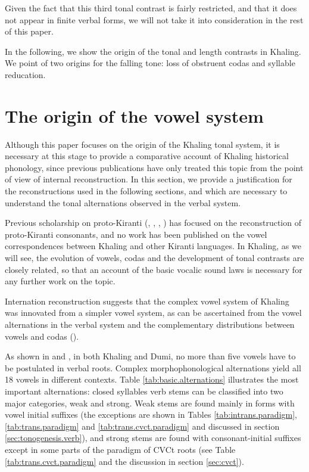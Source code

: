 \documentclass[oldfontcommands,oneside,a4paper,11pt]{article}
\begin{document}
Given the fact that this third tonal contrast is fairly restricted, and that it does not appear in finite verbal forms, we will not take it into consideration in the rest of this paper.


In the following, we show the origin of the tonal and length contrasts in Khaling. We point of two origins for the falling tone: loss of obstruent codas and syllable reducation.

\section{The origin of the vowel system}
Although this paper focuses on the origin of the Khaling tonal system, it is necessary at this stage to provide a comparative account of Khaling historical phonology, since previous publications have only treated this topic from the point of view of internal reconstruction. In this section, we provide a justification for the reconstructions used in the following sections, and which are necessary to understand the tonal alternations observed in the verbal system.

Previous scholarship on proto-Kiranti (\citealt{driem90r}, \citealt{michailovsky94stops}, \citealt{starostin94kiranti}, \citealt{opgenort05jero}) has focused on the reconstruction of proto-Kiranti consonants, and no work has been published on the vowel correspondences between Khaling and other Kiranti languages. In Khaling, as we will see, the evolution of vowels, codas and the development of tonal contrasts are closely related, so that an account of the basic vocalic sound laws is necessary for any further work on the topic.

Internation reconstruction suggests that the complex vowel system of Khaling was innovated from a simpler   vowel system, as can be ascertained from the vowel alternations in the verbal system and the complementary distributions between vowels and codas (\citealt{jacques12khaling}). 

As shown in \citet{jacques12khaling} and \citet{michailovsky12dumi}, in both Khaling and Dumi, no more than five vowels have to be postulated in verbal roots. Complex morphophonological alternations yield all 18 vowels in different contexts. Table \ref{tab:basic.alternations} illustrates  the most important alternations: closed syllables verb stems can be classified into two major categories, weak and strong. Weak stems are found mainly in forms with vowel initial suffixes (the exceptions are shown in Tables \ref{tab:intrans.paradigm}, \ref{tab:trans.paradigm} and \ref{tab:trans.cvct.paradigm} and discussed in section \ref{sec:tonogenesis.verb}), and strong stems are   found with consonant-initial suffixes except in some parts of the paradigm of CVCt roots (see Table \ref{tab:trans.cvct.paradigm} and the discussion in section \ref{sec:cvct}).
\end{document}
